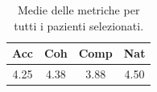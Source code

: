 
\begin{table}[!h]
\centering
\begin{tabular}{||c c c c||}
\hline
Acc & Coh & Comp & Nat \\ [0.5ex]
\hline\hline
4.25 & 4.38 & 3.88 & 4.50 \\
\hline
\end{tabular}
\caption{Medie delle metriche per tutti i pazienti selezionati.}
\label{tab:metriche_finali_pazienti}
\end{table}
